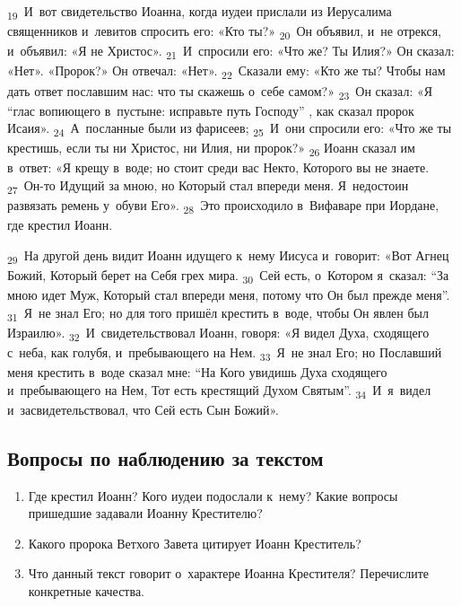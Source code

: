 \documentclass[a4paper,12pt]{article}
\begin{document}
 \textsubscript{19}~И~вот свидетельство Иоанна, когда иудеи прислали из Иерусалима священников и~левитов спросить его: «Кто ты?» \textsubscript{20}~Он объявил, и~не отрекся, и~объявил: «Я не Христос». \textsubscript{21}~И~спросили его: «Что же? Ты Илия?» Он сказал: «Нет». «Пророк?» Он отвечал: «Нет». \textsubscript{22}~Сказали ему: «Кто же ты? Чтобы нам дать ответ пославшим нас: что ты скажешь о~себе самом?» \textsubscript{23}~Он сказал: «Я “глас вопиющего в~пустыне: исправьте путь Господу” , как сказал пророк Исаия». \textsubscript{24}~А~посланные были из фарисеев; \textsubscript{25}~И~они спросили его: «Что же ты крестишь, если ты ни Христос, ни Илия, ни пророк?» \textsubscript{26} Иоанн сказал им в~ответ: «Я крещу в~воде; но стоит среди вас Некто, Которого вы не знаете. \textsubscript{27}~Он-то Идущий за мною, но Который стал впереди меня. Я~недостоин развязать ремень у~обуви Его». \textsubscript{28}~Это происходило в~Вифаваре при Иордане, где крестил Иоанн. 
 
 \textsubscript{29}~На другой день видит Иоанн идущего к~нему Иисуса и~говорит: «Вот Агнец Божий, Который берет на Себя грех мира. \textsubscript{30}~Сей есть, о~Котором я~сказал: “За мною идет Муж, Который стал впереди меня, потому что Он был прежде меня”. \textsubscript{31}~Я~не знал Его; но для того пришёл крестить в~воде, чтобы Он явлен был Израилю». \textsubscript{32}~И~свидетельствовал Иоанн, говоря: «Я видел Духа, сходящего с~неба, как голубя, и~пребывающего на Нем. \textsubscript{33}~Я~не знал Его; но Пославший меня крестить в~воде сказал мне: “На Кого увидишь Духа сходящего и~пребывающего на Нем, Тот есть крестящий Духом Святым”. \textsubscript{34}~И~я~видел и~засвидетельствовал, что Сей есть Сын Божий».

\subsection*{Вопросы по наблюдению за текстом}
\begin{enumerate}
    \item Где крестил Иоанн? Кого иудеи подослали к~нему? Какие вопросы пришедшие задавали Иоанну Крестителю? 
    
    \myline
    
    \myline
    \item Какого пророка Ветхого Завета цитирует Иоанн Креститель? 
    
    \myline
    
    \myline
    \item Что данный текст говорит о~характере Иоанна Крестителя? Перечислите конкретные качества.
    
    \myline
    
    \myline
\end{enumerate}
\end{document}
